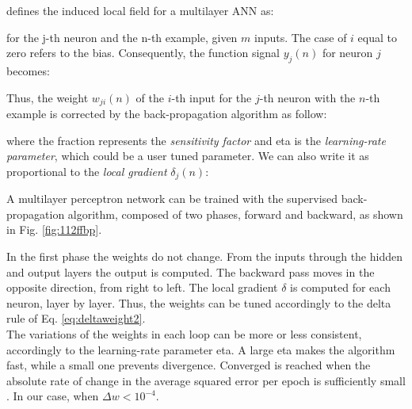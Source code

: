 \citet {RefWorks:158} defines the induced local field for a multilayer
\acs{ANN} as:

for the j-th neuron and the n-th example, given $m$ inputs.
The case of $i$ equal to zero refers to the bias.
Consequently, the function signal $y_j(n)$ for neuron $j$ becomes: 

Thus, the weight $w_{ji}(n)$ of the $i$-th input for the $j$-th neuron
with the $n$-th example is corrected by the back-propagation algorithm as
follow:

where the fraction represents the \textit{sensitivity factor} and \acs{eta} is
the \textit{learning-rate parameter}, which could be a user tuned parameter.
We can also write it as proportional to the \textit{local gradient}
$\delta_j(n)$:

A multilayer perceptron network can be trained with the
supervised back-propagation algorithm, composed of two phases, forward and
backward, as shown in Fig. \ref{fig:112ffbp}.

In the first phase the weights do not change. 
From the inputs through the hidden
and output layers the output is computed.
The backward pass moves in the opposite direction, from right to left.
The local gradient $\delta$ is computed for each neuron, layer by layer.
Thus, the weights can be tuned accordingly to the delta rule of Eq.
\ref{eq:deltaweight2}.\\
The variations of the weights in each loop can be more or less consistent,
accordingly to the learning-rate parameter \acs{eta}. 
A large \acs{eta} makes the algorithm fast,
while a small one prevents divergence.
Converged is reached when the absolute rate of change in the average squared
error per epoch is sufficiently small \cite {RefWorks:158}.
In our case, when $\Delta w < 10^{-4}$.\\


% 

